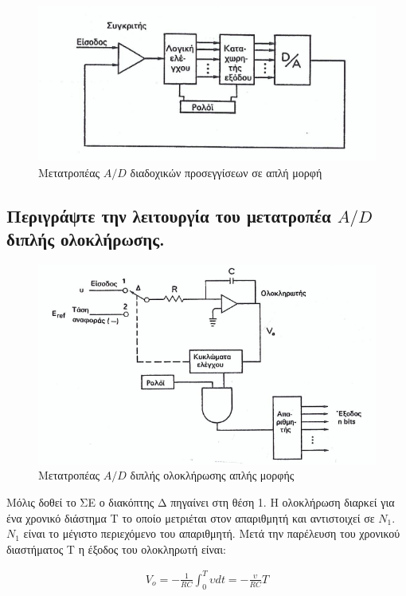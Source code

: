 \documentclass{article}
\begin{document}
\begin{figure}[h!]
    \includegraphics[width=\linewidth]{metatropeasdiadoxikwnproseggisewn.png}
    \caption{Μετατροπέας $A/D$ διαδοχικών προσεγγίσεων σε απλή μορφή}
\end{figure}

\subsection{Περιγράψτε την λειτουργία του μετατροπέα $A/D$ διπλής 
ολοκλήρωσης.}

\begin{figure}[h!]
    \includegraphics[width=\linewidth]{AD2olok.png}
    \caption{Μετατροπέας $A/D$ διπλής ολοκλήρωσης απλής μορφής}
\end{figure}
Μόλις δοθεί το ΣΕ ο διακόπτης Δ πηγαίνει στη θέση 1. Η ολοκλήρωση διαρκεί για ένα χρονικό διάστημα Τ το οποίο μετριέται στον απαριθμητή και αντιστοιχεί σε $N_1$. $N_1$ είναι το μέγιστο 
περιεχόμενο του απαριθμητή. Μετά την παρέλευση του χρονικού διαστήματος Τ η έξοδος του ολοκληρωτή είναι: 

\begin{align*}
    V_o=-\frac{1}{RC}\int^{T}_{0} \upsilon dt=-\frac{\upsilon}{RC}T
\end{align*}
\end{document}
